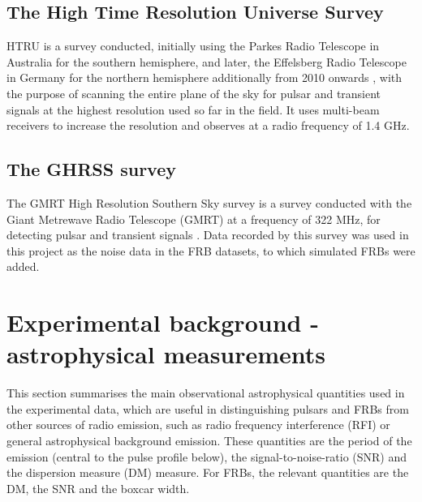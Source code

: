\documentclass[12pt]{article}
\begin{document}
\subsection{The High Time Resolution Universe Survey}
HTRU is a survey conducted, initially using the Parkes Radio Telescope in Australia for the southern hemisphere, and later, the Effelsberg Radio Telescope in Germany for the northern hemisphere additionally from 2010 onwards \cite{keith2010high}\cite{ng2012conducting}, with the purpose of scanning the entire plane of the sky for pulsar and transient signals at the highest resolution used so far in the field. It uses multi-beam receivers to increase the resolution and observes at a radio frequency of 1.4 GHz.

\subsection{The GHRSS survey}
The GMRT High Resolution Southern Sky survey is a survey conducted with the Giant Metrewave Radio Telescope (GMRT) at a frequency of 322 MHz, for detecting pulsar and transient signals \cite{bhattacharyya2016gmrt}. Data recorded by this survey was used in this project as the noise data in the FRB datasets, to which simulated FRBs were added.

\section{Experimental background - astrophysical measurements}
This section summarises the main observational astrophysical quantities used in the experimental data, which are useful in distinguishing pulsars and FRBs from other sources of radio emission, such as radio frequency interference (RFI) or general astrophysical background emission. These quantities are the period of the emission (central to the pulse profile below), the signal-to-noise-ratio (SNR) and the dispersion measure (DM) measure. For FRBs, the relevant quantities are the DM, the SNR and the boxcar width.
\end{document}
